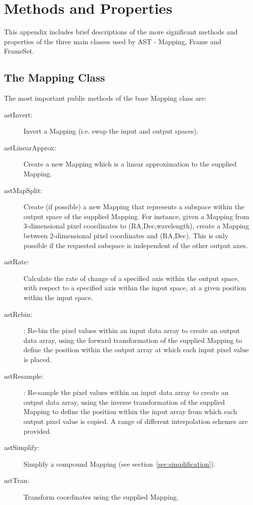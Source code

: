 \documentclass[final,authoryear,5p,times,twocolumn]{elsarticle}
\begin{document}
\appendix

\section{Methods and Properties}
\label{app:classes}

This appendix includes brief descriptions of the more significant methods
and properties of the three main classes used by AST - Mapping, Frame and
FrameSet.

\subsection{The Mapping Class}
The most important public methods of the base Mapping class are:

\begin{description}

\item[astInvert:] Invert a Mapping (i.e. swap the input and output spaces).

\item[astLinearApprox:] Create a new Mapping which is a linear approximation
to the supplied Mapping.

\item[astMapSplit:] Create (if possible) a new Mapping that represents a
subspace within the output space of the supplied Mapping. For instance,
given a Mapping from 3-dimensional pixel coordinates to
(RA,Dec,wavelength), create a Mapping between 2-dimensional pixel
coordinates and (RA,Dec). This is only possible if the requested subspace
is independent of the other output axes.

\item[astRate:] Calculate the rate of change of a specified axis within the
output space, with respect to a specified axis within the input space, at
a given position within the input space.

\item[astRebin:]: Re-bin the pixel values within an input data array to create
an output data array, using the forward transformation of the supplied Mapping
to define the position within the output array at which each input pixel value
is placed.

\item[astResample:]: Re-sample the pixel values within an input data array to
create an output data array, using the inverse transformation of the supplied
Mapping to define the position within the input array from which each
output pixel value is copied. A range of different interpolation schemes
are provided.

\item[astSimplify:] Simplify a compound Mapping (see
section~\ref{sec:simplification}).

\item[astTran:] Transform coordinates using the supplied Mapping.

\end{description}
\end{document}
